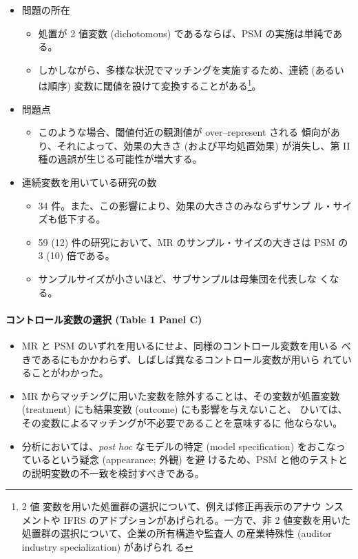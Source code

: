 \begin{itemize}
 \item 問題の所在
       \begin{itemize}
        \item 処置が 2 値変数 (dichotomous) であるならば、PSM の実施は単純である。
        \item しかしながら、多様な状況でマッチングを実施するため、連続 (あるい
              は順序) 変数に閾値を設けて変換することがある\footnote{2 値
              変数を用いた処置群の選択について、例えば修正再表示のアナウ
              ンスメントや IFRS のアドプションがあげられる。一方で、非 2
              値変数を用いた処置群の選択について、企業の所有構造や監査人
              の産業特殊性 (auditor industry specialization) があげられ
              る}。
       \end{itemize}
 \item 問題点
       \begin{itemize}
        \item このような場合、閾値付近の観測値が over--represent される
              傾向があり、それによって、効果の大きさ (および平均処置効果)
              が消失し、第 II 種の過誤が生じる可能性が増大する。
       \end{itemize}
 \item 連続変数を用いている研究の数
       \begin{itemize}
        \item 34 件。また、この影響により、効果の大きさのみならずサンプ
              ル・サイズも低下する。
        \item 59 (12) 件の研究において、MR のサンプル・サイズの大きさは
              PSM の 3 (10) 倍である。
        \item サンプルサイズが小さいほど、サブサンプルは母集団を代表しな
              くなる。
       \end{itemize}
\end{itemize}

\paragraph{コントロール変数の選択 (Table 1 Panel C)}

\begin{itemize}
 \item MR と PSM のいずれを用いるにせよ、同様のコントロール変数を用いる
       べきであるにもかかわらず、しばしば異なるコントロール変数が用いら
       れていることがわかった。
 \item MR からマッチングに用いた変数を除外することは、その変数が処置変数
       (treatment) にも結果変数 (outcome) にも影響を与えないこと、
       ひいては、その変数によるマッチングが不必要であることを意味するに
       他ならない。
 \item 分析においては、\textit{post hoc} なモデルの特定 (model
       specification) をおこなっているという疑念 (appearance; 外観) を避
       けるため、PSM と他のテストとの説明変数の不一致を検討すべきである。
\end{itemize}

